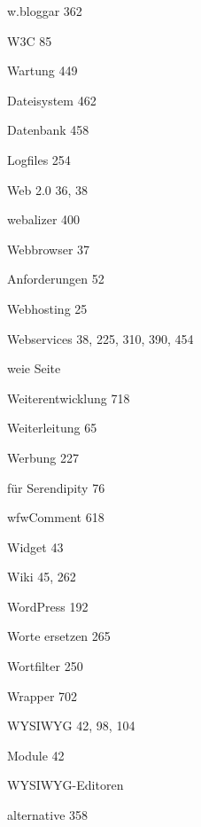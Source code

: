 \documentclass{book}
\renewcommand\subitem{\par}
\begin{document}
\begin{multicols}{2}
\begin{osp-index}
  \item w.bloggar\hspace{1mm} 362
  \item W3C\hspace{1mm} 85
  \item Wartung\hspace{1mm} 449
    \subitem Dateisystem\hspace{1mm} 462
    \subitem Datenbank\hspace{1mm} 458
    \subitem Logfiles\hspace{1mm} 254
  \item Web 2.0\hspace{1mm} 36, 38
  \item webalizer\hspace{1mm} 400
  \item Webbrowser\hspace{1mm} 37
    \subitem Anforderungen\hspace{1mm} 52
  \item Webhosting\hspace{1mm} 25
  \item Webservices\hspace{1mm} 38, 225, 310, 390, 454
  \item wei\IeC {\ss }e Seite\hspace{1mm} 
  \item Weiterentwicklung\hspace{1mm} 718
  \item Weiterleitung\hspace{1mm} 65
  \item Werbung\hspace{1mm} 227
    \subitem f\"ur Serendipity\hspace{1mm} 76
  \item wfwComment\hspace{1mm} 618
  \item Widget\hspace{1mm} 43
  \item Wiki\hspace{1mm} 45, 262
  \item WordPress\hspace{1mm} 192
  \item Worte ersetzen\hspace{1mm} 265
  \item Wortfilter\hspace{1mm} 250
  \item Wrapper\hspace{1mm} 702
  \item WYSIWYG\hspace{1mm} 42, 98, 104
    \subitem Module\hspace{1mm} 42
  \item WYSIWYG-Editoren
    \subitem alternative\hspace{1mm} 358


\end{osp-index}
\end{multicols}
\end{document}
